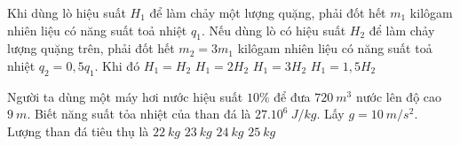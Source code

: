 
\begin{ex}
	Khi dùng lò hiệu suất $H_1$ để làm chảy một lượng quặng, phải đốt hết $m_1$ kilôgam nhiên liệu có năng suất toả nhiệt $q_1$. Nếu dùng lò có hiệu suất $H_2$ để làm chảy lượng quặng trên, phải đốt hết
	$m_2=3m_1$ kilôgam nhiên liệu có năng suất toả nhiệt $q_2=0,5 q_1$. Khi đó
	\choice
	{$H_1=H_2$}
	{$H_1=2 H_2$}
	{$H_1=3 H_2$}
	{\True $H_1=1,5 H_2$}
	\end{ex}


\begin{ex}
	Người ta dùng một máy hơi nước hiệu suất $10 \%$ để đưa $720\ m^3$ nước lên độ cao $9\ m$. Biết năng suất tỏa nhiệt của than đá là $27 . 10^{6}\ J/kg$. Lấy $g=10\ m/s^2$. Lượng than đá tiêu thụ là
	\choice
	{$22\ kg$}
	{$23\ kg$}
	{\True $24\ kg$}
	{$25\ kg$}
	\end{ex}



